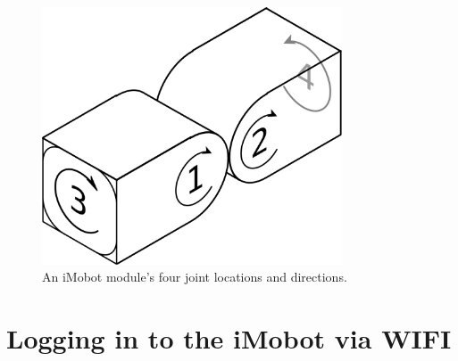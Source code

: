 \documentclass[11pt]{report}
\begin{document}
\begin{figure}
\begin{center}
\includegraphics[width=3.5in]{images/joint_diagram.png}
\caption{\label{fig:joint_diagram}An iMobot module's four joint locations and directions.}
\end{center}
\end{figure}

\chapter{Logging in to the iMobot via WIFI}
\end{document}

